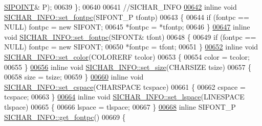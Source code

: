 \begin{DoxyCode}
      \hyperlink{struct_s_i_p_o_i_n_t}{SIPOINT}& P);
00639 \};
00640 
00641 \textcolor{comment}{//SICHAR\_INFO}
\hyperlink{class_s_i_c_h_a_r___i_n_f_o_a7dd5af8833b1951a6e4759668d484f37}{00642} \textcolor{keyword}{inline} \textcolor{keywordtype}{void} \hyperlink{class_s_i_c_h_a_r___i_n_f_o_a7dd5af8833b1951a6e4759668d484f37}{SICHAR\_INFO::set\_fontpc}(SIFONT\_P tfontp)
00643 \{
00644     \textcolor{keywordflow}{if} (fontpc == NULL) fontpc = \textcolor{keyword}{new} SIFONT;
00645     *fontpc = *tfontp;
00646 \}
\hyperlink{class_s_i_c_h_a_r___i_n_f_o_a01ad1057400db3ccec680de26f4ab0a2}{00647} \textcolor{keyword}{inline} \textcolor{keywordtype}{void} \hyperlink{class_s_i_c_h_a_r___i_n_f_o_a7dd5af8833b1951a6e4759668d484f37}{SICHAR\_INFO::set\_fontpc}(SIFONT& tfont)
00648 \{
00649     \textcolor{keywordflow}{if} (fontpc == NULL) fontpc = \textcolor{keyword}{new} SIFONT;
00650     *fontpc = tfont;
00651 \}
\hyperlink{class_s_i_c_h_a_r___i_n_f_o_a3c7718568eb9ff885af1bdfa8c197236}{00652} \textcolor{keyword}{inline} \textcolor{keywordtype}{void} \hyperlink{class_s_i_c_h_a_r___i_n_f_o_a3c7718568eb9ff885af1bdfa8c197236}{SICHAR\_INFO::set\_color}(COLORERF tcolor)
00653 \{
00654     color = tcolor;
00655 \}
\hyperlink{class_s_i_c_h_a_r___i_n_f_o_afe883164593a8d3a5c9377eb5454c9f1}{00656} \textcolor{keyword}{inline} \textcolor{keywordtype}{void} \hyperlink{class_s_i_c_h_a_r___i_n_f_o_afe883164593a8d3a5c9377eb5454c9f1}{SICHAR\_INFO::set\_size}(CHARSIZE tsize)
00657 \{
00658     size = tsize;
00659 \}
\hyperlink{class_s_i_c_h_a_r___i_n_f_o_a18aaf35f07094cb42942663a71456227}{00660} \textcolor{keyword}{inline} \textcolor{keywordtype}{void} \hyperlink{class_s_i_c_h_a_r___i_n_f_o_a18aaf35f07094cb42942663a71456227}{SICHAR\_INFO::set\_cspace}(CHARSPACE tcspace)
00661 \{
00662     cspace = tcspace;
00663 \}
\hyperlink{class_s_i_c_h_a_r___i_n_f_o_af38e1eac74e8d9c14e5c5d05d58f8b36}{00664} \textcolor{keyword}{inline} \textcolor{keywordtype}{void} \hyperlink{class_s_i_c_h_a_r___i_n_f_o_af38e1eac74e8d9c14e5c5d05d58f8b36}{SICHAR\_INFO::set\_lspace}(LINESPACE tlspace)
00665 \{
00666     lspace = tlspace;
00667 \}
\hyperlink{class_s_i_c_h_a_r___i_n_f_o_ad53aa1c6641e81bf0b79f17836aa5dfa}{00668} \textcolor{keyword}{inline} SIFONT\_P \hyperlink{class_s_i_c_h_a_r___i_n_f_o_ad53aa1c6641e81bf0b79f17836aa5dfa}{SICHAR\_INFO::get\_fontpc}()
00669 \{

\end{DoxyCode}
